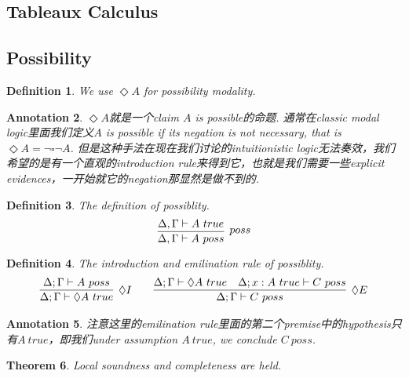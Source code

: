 \documentclass{article}
\theoremstyle{plain}
\newtheorem{theorem}{Theorem}
\newtheorem{definition}[theorem]{Definition}
\newtheorem{annotation}[theorem]{Annotation}
\theoremstyle{nonumberplain}
\begin{document}
\subsection{Tableaux Calculus}


\newpage
\subsection{Possibility}

\begin{definition}
\rm We use $\Diamond A$ for possibility modality.
\end{definition}

\begin{annotation}
\rm $\Diamond A$就是一个claim $A$ is possible的命题. 通常在classic modal logic里面我们定义$A$ is possible if its negation is not necessary, that is $\Diamond A = \neg \square \neg A$. 但是这种手法在现在我们讨论的intuitionistic logic无法奏效，我们希望的是有一个直观的introduction rule来得到它，也就是我们需要一些explicit evidences，一开始就它的negation那显然是做不到的. 
\end{annotation}

\begin{definition}
\rm \cite{15-816-ciom}The definition of possiblity.
$$
\infer[poss]{\Delta,\Gamma \vdash A~poss}{\Delta,\Gamma \vdash A~true}
$$
\end{definition}


\begin{definition}
\rm The introduction and emilination rule of possiblity.
$$
\begin{aligned}
\infer[\Diamond I]{\Delta;\Gamma \vdash \Diamond A~true}{\Delta;\Gamma \vdash A~poss} &&&&
\infer[\Diamond E]{\Delta;\Gamma \vdash C~poss}{\Delta;\Gamma \vdash \Diamond A~true & \Delta;x:A~true \vdash C~poss}
\end{aligned}
$$
\end{definition}

\begin{annotation}
\rm 注意这里的emilination rule里面的第二个premise中的hypothesis只有$A ~true$，即我们under assumption $A~true$, we conclude $C~poss$.
\end{annotation}

\begin{theorem}
\rm Local soundness and completeness are held. 
\end{theorem}
\end{document}
